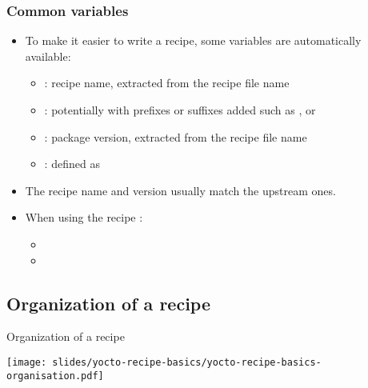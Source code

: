 \begin{frame}
  \frametitle{Common variables}
  \begin{itemize}
    \item To make it easier to write a recipe, some variables are
      automatically available:
      \begin{itemize}
        \item {}: recipe name, extracted from the recipe file name
        \item {}:  potentially with prefixes or suffixes added
          such as , or 
        \item {}: package version, extracted from the recipe file name
        \item {}: defined as 
      \end{itemize}
    \item The recipe name and version usually match the upstream ones.
    \item When using the recipe :
      \begin{itemize}
        \item {}
        \item {}
      \end{itemize}
  \end{itemize}
\end{frame}

\subsection{Organization of a recipe}

\begin{frame}{Organization of a recipe}
  \begin{center}
    \texttt{[image: slides/yocto-recipe-basics/yocto-recipe-basics-organisation.pdf]}
  \end{center}
\end{frame}

